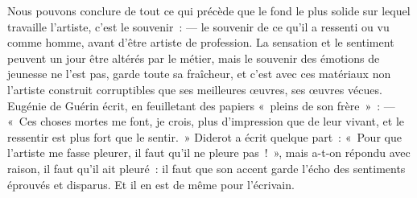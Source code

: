 \documentclass[french,twoside]{book} %
\begin{document}
Nous pouvons conclure de tout ce qui précède que le fond le plus solide sur lequel travaille l’artiste, c’est le souvenir : — le souvenir de ce qu’il a ressenti ou vu comme homme, avant d’être artiste de profession. La sensation et le sentiment peuvent un jour être altérés par le métier, mais le souvenir des émotions de jeunesse ne l’est pas, garde toute sa fraîcheur, et c’est avec ces matériaux non l’artiste construit corruptibles que ses meilleures œuvres, ses œuvres vécues. Eugénie de Guérin écrit, en feuilletant des papiers « pleins de son frère » : — « Ces choses mortes me font, je crois, plus d’impression que de leur vivant, et le ressentir est plus fort que le sentir. » Diderot a écrit quelque part : « Pour que l’artiste me fasse pleurer, il faut qu’il ne pleure pas ! », mais a-t-on répondu avec raison, il faut qu’il ait pleuré : il faut que son accent garde l’écho des sentiments éprouvés et disparus. Et il en est de même pour l’écrivain.\par
\end{document}
